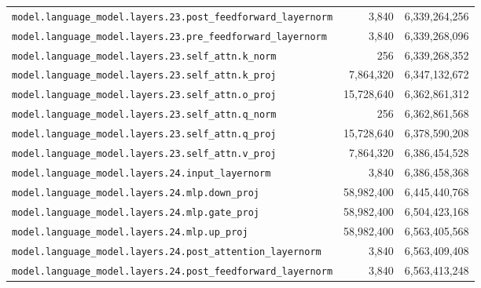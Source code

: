 \documentclass[10pt,a4paper]{article}
\theoremstyle{definition}
\begin{document}
\begin{appendices}
\begin{longtable}{p{9.5cm}rr}
\texttt{model.\allowbreak{}language\_model.\allowbreak{}layers.\allowbreak{}23.\allowbreak{}post\_feedforward\_layernorm} & 3,840 & 6,339,264,256 \\
\texttt{model.\allowbreak{}language\_model.\allowbreak{}layers.\allowbreak{}23.\allowbreak{}pre\_feedforward\_layernorm} & 3,840 & 6,339,268,096 \\
\texttt{model.\allowbreak{}language\_model.\allowbreak{}layers.\allowbreak{}23.\allowbreak{}self\_attn.\allowbreak{}k\_norm} & 256 & 6,339,268,352 \\
\texttt{model.\allowbreak{}language\_model.\allowbreak{}layers.\allowbreak{}23.\allowbreak{}self\_attn.\allowbreak{}k\_proj} & 7,864,320 & 6,347,132,672 \\
\texttt{model.\allowbreak{}language\_model.\allowbreak{}layers.\allowbreak{}23.\allowbreak{}self\_attn.\allowbreak{}o\_proj} & 15,728,640 & 6,362,861,312 \\
\texttt{model.\allowbreak{}language\_model.\allowbreak{}layers.\allowbreak{}23.\allowbreak{}self\_attn.\allowbreak{}q\_norm} & 256 & 6,362,861,568 \\
\texttt{model.\allowbreak{}language\_model.\allowbreak{}layers.\allowbreak{}23.\allowbreak{}self\_attn.\allowbreak{}q\_proj} & 15,728,640 & 6,378,590,208 \\
\texttt{model.\allowbreak{}language\_model.\allowbreak{}layers.\allowbreak{}23.\allowbreak{}self\_attn.\allowbreak{}v\_proj} & 7,864,320 & 6,386,454,528 \\
\texttt{model.\allowbreak{}language\_model.\allowbreak{}layers.\allowbreak{}24.\allowbreak{}input\_layernorm} & 3,840 & 6,386,458,368 \\
\texttt{model.\allowbreak{}language\_model.\allowbreak{}layers.\allowbreak{}24.\allowbreak{}mlp.\allowbreak{}down\_proj} & 58,982,400 & 6,445,440,768 \\
\texttt{model.\allowbreak{}language\_model.\allowbreak{}layers.\allowbreak{}24.\allowbreak{}mlp.\allowbreak{}gate\_proj} & 58,982,400 & 6,504,423,168 \\
\texttt{model.\allowbreak{}language\_model.\allowbreak{}layers.\allowbreak{}24.\allowbreak{}mlp.\allowbreak{}up\_proj} & 58,982,400 & 6,563,405,568 \\
\texttt{model.\allowbreak{}language\_model.\allowbreak{}layers.\allowbreak{}24.\allowbreak{}post\_attention\_layernorm} & 3,840 & 6,563,409,408 \\
\texttt{model.\allowbreak{}language\_model.\allowbreak{}layers.\allowbreak{}24.\allowbreak{}post\_feedforward\_layernorm} & 3,840 & 6,563,413,248 \\

\end{longtable}
\end{appendices}
\end{document}
